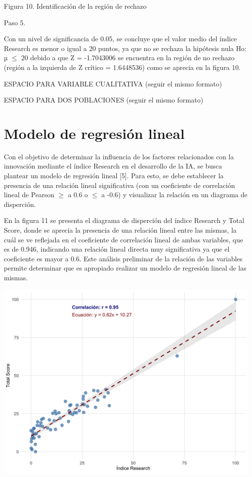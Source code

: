 \documentclass[
]{article}
\begin{document}
\begin{multicols}{2}
Figura 10. Identificación de la región de rechazo

Paso 5.

Con un nivel de significancia de 0.05, se concluye que el valor medio del índice Research es menor o igual a 20 puntos, ya que no se rechaza la hipótesis nula Ho: µ $≤$ 20 debido a que Z = -1.7043006 se encuentra en la región de no rechazo (región a la izquierda de Z crítico = 1.6448536) como se aprecia en la figura 10.

ESPACIO PARA VARIABLE CUALITATIVA (seguir el mismo formato)

ESPACIO PARA DOS POBLACIONES (seguir el mismo formato)


\section{Modelo de regresión lineal}

Con el objetivo de determinar la influencia de los factores relacionados con la innovación mediante el índice Research en el desarrollo de la IA, se busca plantear un modelo de regresión lineal [5]. Para esto, se debe establecer la presencia de una relación lineal significativa (con un coeficiente de correlación lineal de Pearson $≥$ a 0.6 o $≤$ a -0.6) y visualizar la relación en un diagrama de disperción.




En la figura 11 se presenta el diagrama de disperción del índice Research y Total Score, donde se aprecia la presencia de una relación lineal entre las mismas, la cuál se ve reflejada en el coeficiente de correlación lineal de ambas variables, que es de 0.946, indicando una relación lineal directa muy significativa ya que el coeficiente es mayor a 0.6. Este análisis preliminar de la relación de las variables permite determinar que es apropiado realizar un modelo de regresión lineal de las mismas.



\begin{center}
\includegraphics[width=\linewidth]{figura11.png}
\end{center}


\end{multicols}
\end{document}
